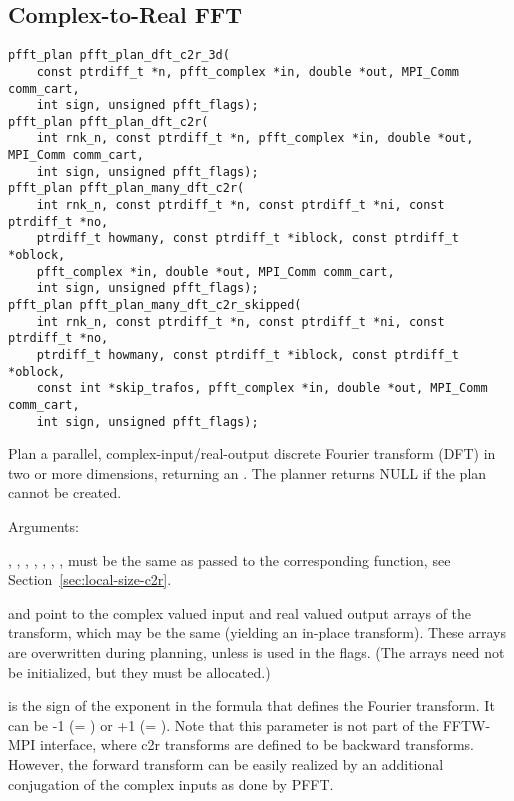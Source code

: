 \subsection{Complex-to-Real FFT}
\begin{lstlisting}
pfft_plan pfft_plan_dft_c2r_3d(
    const ptrdiff_t *n, pfft_complex *in, double *out, MPI_Comm comm_cart,
    int sign, unsigned pfft_flags);
pfft_plan pfft_plan_dft_c2r(
    int rnk_n, const ptrdiff_t *n, pfft_complex *in, double *out, MPI_Comm comm_cart,
    int sign, unsigned pfft_flags);
pfft_plan pfft_plan_many_dft_c2r(
    int rnk_n, const ptrdiff_t *n, const ptrdiff_t *ni, const ptrdiff_t *no,
    ptrdiff_t howmany, const ptrdiff_t *iblock, const ptrdiff_t *oblock,
    pfft_complex *in, double *out, MPI_Comm comm_cart,
    int sign, unsigned pfft_flags);
pfft_plan pfft_plan_many_dft_c2r_skipped(
    int rnk_n, const ptrdiff_t *n, const ptrdiff_t *ni, const ptrdiff_t *no,
    ptrdiff_t howmany, const ptrdiff_t *iblock, const ptrdiff_t *oblock,
    const int *skip_trafos, pfft_complex *in, double *out, MPI_Comm comm_cart,
    int sign, unsigned pfft_flags);
\end{lstlisting}
Plan a parallel, complex-input/real-output discrete Fourier transform (DFT) in two or more dimensions, returning an .
The planner returns NULL if the plan cannot be created.

Arguments:
\begin{compactitem}
  \item {}, , , , , , ,  must be the same as passed
        to the corresponding  function, see Section~\ref{sec:local-size-c2r}.
  \item {} and  point to the complex valued input and real valued output arrays of the transform,
        which may be the same (yielding an in-place transform).
        These arrays are overwritten during planning, unless  is used in the flags.
        (The arrays need not be initialized, but they must be allocated.)
  \item {} is the sign of the exponent in the formula that defines the Fourier transform. It can be -1 (= ) or +1 (= ).
        Note that this parameter is not part of the FFTW-MPI interface, where c2r transforms are defined to be backward transforms.
        However, the forward transform can be easily realized by an additional conjugation of the complex inputs as done by PFFT.
\end{compactitem}


